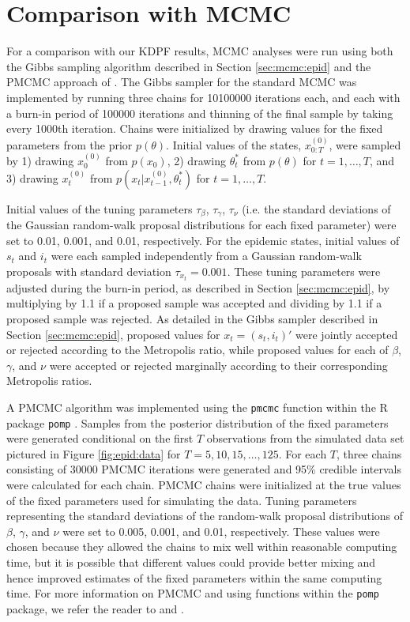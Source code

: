 \section{Comparison with MCMC} \label{sec:epid:pmcmc}

For a comparison with our KDPF results, MCMC analyses were run using both the Gibbs sampling algorithm described in Section \ref{sec:mcmc:epid} and the PMCMC approach of \citet{Andr:Douc:Hol:pmcmc:2010}. The Gibbs sampler for the standard MCMC was implemented by running three chains for 10100000 iterations each, and each with a burn-in period of 100000 iterations and thinning of the final sample by taking every 1000th iteration. Chains were initialized by drawing values for the fixed parameters from the prior $p(\theta)$. Initial values of the states, $x_{0:T}^{(0)}$, were sampled by 1) drawing $x_0^{(0)}$ from $p(x_0)$, 2) drawing $\theta^*_t$ from $p(\theta)$ for $t =1,\ldots,T$, and 3) drawing $x_t^{(0)}$ from $p(x_t|x_{t-1}^{(0)},\theta^*_t)$ for $t =1,\ldots,T$.

Initial values of the tuning parameters $\tau_{\beta}$, $\tau_{\gamma}$, $\tau_{\nu}$ (i.e. the standard deviations of the Gaussian random-walk proposal distributions for each fixed parameter) were set to 0.01, 0.001, and 0.01, respectively. For the epidemic states, initial values of $s_t$ and $i_t$ were each sampled independently from a Gaussian random-walk proposals with standard deviation $\tau_{x_t} = 0.001$. These tuning parameters were adjusted during the burn-in period, as described in Section \ref{sec:mcmc:epid}, by multiplying by 1.1 if a proposed sample was accepted and dividing by 1.1 if a proposed sample was rejected. As detailed in the Gibbs sampler described in Section \ref{sec:mcmc:epid}, proposed values for $x_t = (s_t,i_t)'$ were jointly accepted or rejected according to the Metropolis ratio, while proposed values for each of $\beta$, $\gamma$, and $\nu$ were accepted or rejected marginally according to their corresponding Metropolis ratios.

A PMCMC algorithm was implemented using the {\tt pmcmc} function within the R package {\tt pomp} \citep{pomp}. Samples from the posterior distribution of the fixed parameters were generated conditional on the first $T$ observations from the simulated data set pictured in Figure \ref{fig:epid:data} for $T = 5, 10, 15, \ldots, 125$. For each $T$, three chains consisting of 30000 PMCMC iterations were generated and 95\% credible intervals were calculated for each chain. PMCMC chains were initialized at the true values of the fixed parameters used for simulating the data. Tuning parameters representing the standard deviations of the random-walk proposal distributions of $\beta$, $\gamma$, and $\nu$ were set to 0.005, 0.001, and 0.01, respectively. These values were chosen because they allowed the chains to mix well within reasonable computing time, but it is possible that different values could provide better mixing and hence improved estimates of the fixed parameters within the same computing time. For more information on PMCMC and using functions within the {\tt pomp} package, we refer the reader to \citet{Andr:Douc:Hol:pmcmc:2010} and \citet{pomp}.


